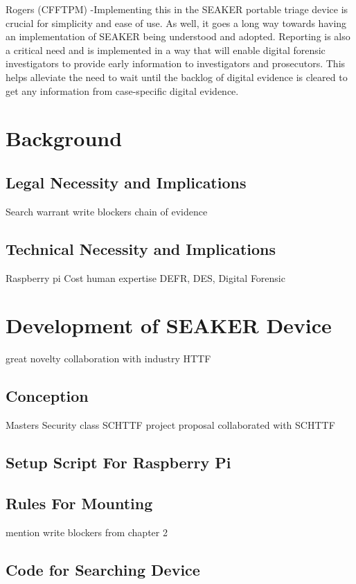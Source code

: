 \documentclass[12pt]{article}
\begin{document}
Rogers (CFFTPM) -Implementing this in the SEAKER portable triage device is crucial for simplicity and ease of use.  As well, it goes a
long way towards having an implementation of SEAKER being understood and adopted.  Reporting is also a critical need
and is implemented in a way that will enable digital forensic investigators to provide early information to
investigators and prosecutors.  This helps alleviate the need to wait until the backlog of digital evidence is cleared
to get any information from case-specific digital evidence.\\


\section{Background}
\label{sect-background}

\subsection{Legal Necessity and Implications}
Search warrant
write blockers
chain of evidence
\subsection{Technical Necessity and Implications}
Raspberry pi
Cost 
human expertise
DEFR, DES, Digital Forensic 



\section{Development of SEAKER Device}
\label{sect-developmentSeakerDevice}
great novelty
collaboration with industry HTTF
\subsection{Conception}
Masters Security class
SCHTTF project proposal
collaborated with SCHTTF
\subsection{Setup Script For Raspberry Pi}

\subsection{Rules For Mounting}
mention write blockers from chapter 2
\subsection{Code for Searching Device}
\end{document}
